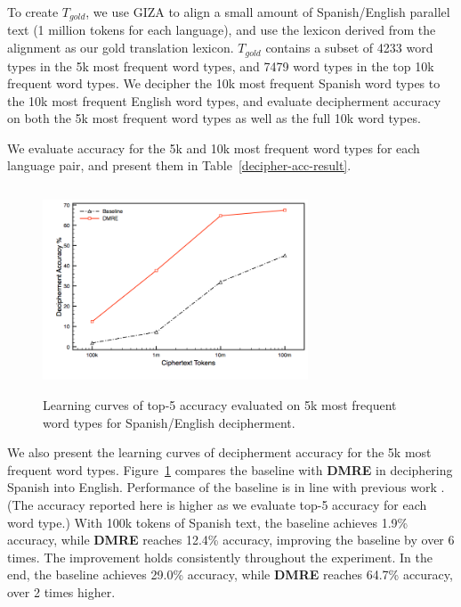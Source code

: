 To create $T_{gold}$, we use GIZA to align a small amount of Spanish/English parallel text (1 million tokens for each language), and use the lexicon derived from the alignment as our gold translation lexicon. $T_{gold}$ contains a subset of 4233 word types in the 5k most frequent word types, and 7479 word types in the top 10k frequent word types. We decipher the 10k most frequent Spanish word types to the 10k most frequent English word types, and evaluate decipherment accuracy on both the 5k most frequent word types as well as the full 10k word types.

We evaluate accuracy for the 5k and 10k most frequent word types for each language pair, and present them in Table~\ref{decipher-acc-result}.


 \begin{figure}[!ht]
  \centering
  \includegraphics[width=3.1in,height=2.4in]{es_en_curve}
  \caption{Learning curves of top-5 accuracy evaluated on 5k most frequent word types for Spanish/English decipherment.}
\label{es-en-curve}
\end{figure}

We also present the learning curves of decipherment accuracy for the 5k most frequent word types. Figure~\ref{es-en-curve} compares the baseline with \textbf{DMRE} in deciphering Spanish into English. Performance of the baseline is in line with previous work \cite{dou-knight:2013:EMNLP}. (The accuracy reported here is higher as we evaluate top-5 accuracy for each word type.) With 100k tokens of Spanish text, the baseline achieves 1.9\% accuracy, while \textbf{DMRE} reaches 12.4\% accuracy, improving the baseline by over 6 times. The improvement holds consistently throughout the experiment. In the end, the baseline achieves 29.0\% accuracy, while \textbf{DMRE} reaches 64.7\% accuracy, over 2 times higher. 

